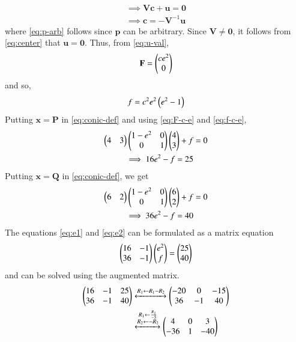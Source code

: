\documentclass[journal,12pt,twocolumn]{IEEEtran}
\renewcommand{\vec}[1]{\boldsymbol{\mathbf{#1}}}
\begin{document}
\begin{enumerate}
\begin{align}
        \implies \vec{Vc} + \vec{u} = \vec{0} \label{eq:p-arb} \\
        \implies \vec{c} = -\vec{V}^{-1}\vec{u}
        \label{eq:center}
    \end{align}
    where \eqref{eq:p-arb} follows since $\vec{p}$ can be arbitrary. Since
    $\vec{V} \neq \vec{0}$, it follows from \eqref{eq:center} that $\vec{u}
    = \vec{0}$. Thus, from \eqref{eq:u-val},
    \begin{align}
        \vec{F} = \myvec{ce^2\\0}
        \label{eq:F-c-e}
    \end{align}
    and so,
    \begin{align}
        f = c^2e^2\left(e^2-1\right)
        \label{eq:f-c-e}
    \end{align}
    Putting $\vec{x} = \vec{P}$ in \eqref{eq:conic-def} and using \eqref{eq:F-c-e}
    and \eqref{eq:f-c-e},
    \begin{align}
        \begin{pmatrix}4&3\end{pmatrix}\begin{pmatrix}1-e^2&0\\0&1\end{pmatrix}\begin{pmatrix}4\\3\end{pmatrix} + f &= 0 \\
        \implies 16e^2 - f = 25 \label{eq:e1}
    \end{align}
    Putting $\vec{x} = \vec{Q}$ in \eqref{eq:conic-def}, we get
    \begin{align}
        \begin{pmatrix}6&2\end{pmatrix}\begin{pmatrix}1-e^2&0\\0&1\end{pmatrix}\begin{pmatrix}6\\2\end{pmatrix} + f &= 0 \\
        \implies 36e^2 - f = 40 \label{eq:e2}
    \end{align}
    The equations \eqref{eq:e1} and \eqref{eq:e2} can be formulated as
    a matrix equation
    \begin{align}
        \begin{pmatrix}16&-1\\36&-1\end{pmatrix}\begin{pmatrix}e^2\\f\end{pmatrix} = \begin{pmatrix}25\\40\end{pmatrix}
        \label{eq:mtx-eqn}
    \end{align}
    and can be solved using the augmented matrix.
    \begin{align}
        \myvec{16&-1&25\\36&-1&40} &\xleftrightarrow[]{R_1\leftarrow R_1-R_2} \myvec{-20&0&-15\\36&-1&40} \\
                 &\xleftrightarrow[]{\substack{R_1\leftarrow\frac{R_1}{-5}\\R_2\leftarrow -R_2}} \myvec{4&0&3\\-36&1&-40} \\

\end{align}
\end{enumerate}
\end{document}
